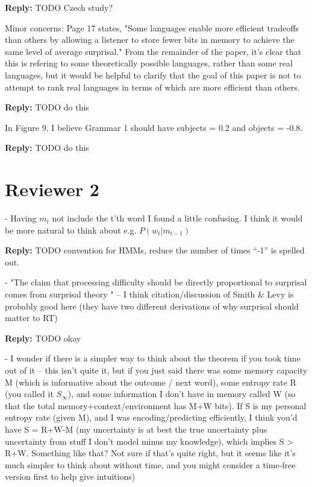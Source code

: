 \documentclass{article}[11pt,a4paper,oneside]
\newenvironment{reply}
  {\par\medskip
   \color{blue}%
   \begin{framed}
   \textbf{Reply: }\ignorespaces}
 {\end{framed}
  \medskip}
\begin{document}
\begin{reply}
	TODO Czech study?
\end{reply}

Minor concerns:
Page 17 states, "Some languages enable more efficient tradeoffs than others by allowing a listener to store fewer bits in memory to achieve the same level of average surprisal." From the remainder of the paper, it's clear that this is refering to some theoretically possible languages, rather than some real languages, but it would be helpful to clarify that the goal of this paper is not to attempt to rank real languages in terms of which are more efficient than others.

\begin{reply}
	TODO do this
\end{reply}

In Figure 9, I believe Grammar 1 should have subjects = 0.2 and objects = -0.8.

\begin{reply}
	TODO do this
\end{reply}


\section{Reviewer 2}

- Having $m_t$ not include the t'th word I found a little confusing. I think it would be more natural to think about e.g. $P(w_t | m_{t-1})$

\begin{reply}
	TODO convention for HMMs, reduce the number of times ``-1'' is spelled out.
\end{reply}

- "The claim that processing difficulty should be directly proportional to surprisal comes from surprisal theory " -- I think citation/discussion of Smith \& Levy is probably good here (they have two different derivations of why surprisal should matter to RT)

\begin{reply}
	TODO okay
\end{reply}

- I wonder if there is a simpler way to think about the theorem if you took time out of it -- this isn't quite it, but if you just said there was some memory capacity M (which is informative about the outcome / next word), some entropy rate R (you called it $S_\infty$), and some information I don't have in memory called W (so that the total memory+context/environment has M+W bits). If S is my personal entropy rate (given M), and I was encoding/predicting efficiently, I think you'd have S = R+W-M (my uncertainty is at best the true uncertainty plus uncertainty from stuff I don't model minus my knowledge), which implies S > R+W. Something like that? Not sure if that's quite right, but it seems like it's much simpler to think about without time, and you might consider a time-free version first to help give intuitions)
\end{document}
